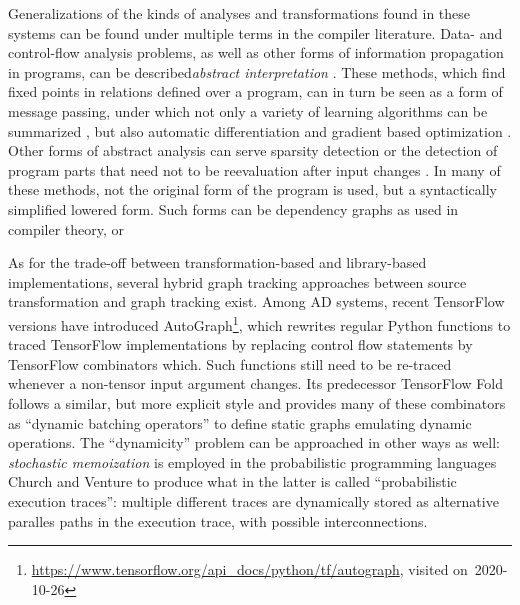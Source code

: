 Generalizations of the kinds of analyses and transformations found in these systems can be found
under multiple terms in the compiler literature.  Data- and control-flow analysis problems, as well
as other forms of information propagation in programs, can be described\emph{abstract
  interpretation} \parencite{muchnick1997advanced,singer2018static}.  These methods, which find
fixed points in relations defined over a program, can in turn be seen as a form of message passing,
under which not only a variety of learning algorithms can be summarized
\parencite{minka2005divergence}, but also automatic differentiation \parencite{minka2019automatic}
and gradient based optimization \parencite{dauwels2005steepest}.  Other forms of abstract analysis
can serve sparsity detection \parencite{gowda2019sparsity} or the detection of program parts that
need not to be reevaluation after input changes \parencite{becker2020dynamic}.  In many of these
methods, not the original form of the program is used, but a syntactically simplified lowered form.
Such forms can be dependency graphs as used in compiler theory, or 



As for the trade-off between transformation-based and library-based implementations, several hybrid
graph tracking approaches between source transformation and graph tracking exist.  Among AD systems,
recent TensorFlow versions have introduced
AutoGraph\footnote{\url{https://www.tensorflow.org/api_docs/python/tf/autograph}, visited
  on~2020-10-26}, which rewrites regular Python functions to traced TensorFlow implementations by
replacing control flow statements by TensorFlow combinators which.  Such functions still need to be
re-traced whenever a non-tensor input argument changes.  Its predecessor TensorFlow Fold
\parencite{looks2017deep} follows a similar, but more explicit style and provides many of these
combinators as \enquote{dynamic batching operators} to define static graphs emulating dynamic
operations.  The \enquote{dynamicity} problem can be approached in other ways as well:
\emph{stochastic memoization} is employed in the probabilistic programming languages Church
\parencite{goodman2012church} and Venture \parencite{mansinghka2014venture} to produce what in the
latter is called \enquote{probabilistic execution traces}: multiple different traces are dynamically
stored as alternative paralles paths in the execution trace, with possible interconnections.


